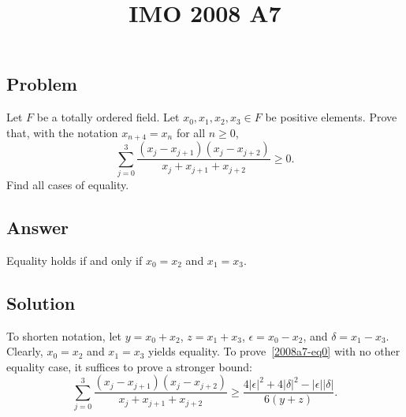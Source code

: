 \documentclass{article}
\title{IMO 2008 A7}
\author{}
\date{}
\begin{document}
\maketitle

\subsection*{Problem}

Let $F$ be a totally ordered field.
Let $x_0, x_1, x_2, x_3 \in F$ be positive elements.
Prove that, with the notation $x_{n + 4} = x_n$ for all $n \geq 0$,
\[ \sum_{j = 0}^3 \frac{(x_j - x_{j + 1})(x_j - x_{j + 2})}{x_j + x_{j + 1} + x_{j + 2}} \geq 0. \tag{*}\label{2008a7-eq0} \]
Find all cases of equality.



\subsection*{Answer}

Equality holds if and only if $x_0 = x_2$ and $x_1 = x_3$.



\subsection*{Solution}

To shorten notation, let $y = x_0 + x_2$, $z = x_1 + x_3$, $\epsilon = x_0 - x_2$, and $\delta = x_1 - x_3$.
Clearly, $x_0 = x_2$ and $x_1 = x_3$ yields equality.
To prove~\eqref{2008a7-eq0} with no other equality case, it suffices to prove a stronger bound:
\[ \sum_{j = 0}^3 \frac{(x_j - x_{j + 1})(x_j - x_{j + 2})}{x_j + x_{j + 1} + x_{j + 2}} \geq \frac{4|\epsilon|^2 + 4|\delta|^2 - |\epsilon||\delta|}{6 (y + z)}. \]
\end{document}
